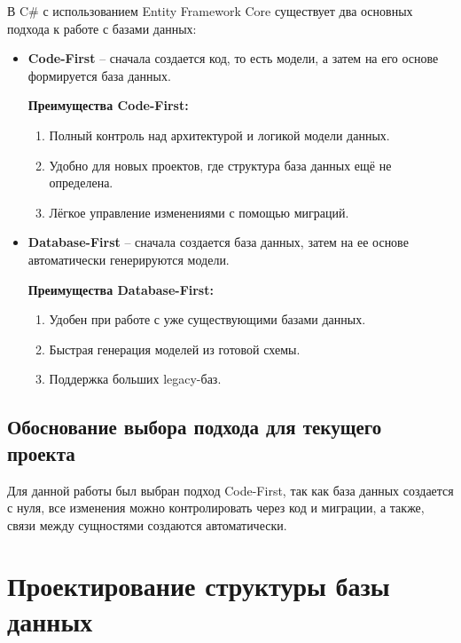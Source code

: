 \documentclass[a4paper,12pt]{report}
\begin{document}
В C\# с использованием Entity Framework Core существует два основных подхода к работе с базами данных:
\begin{itemize}
    \item
        \textbf{Code-First} -- сначала создается код, то есть модели, а затем на его основе формируется база данных.

        \textbf{Преимущества Code-First:}
        \begin{enumerate}
                    \item
                        Полный контроль над архитектурой и логикой модели данных.
                    \item
                        Удобно для новых проектов, где структура база данных ещё не определена.
                    \item
                        Лёгкое управление изменениями с помощью миграций.
        \end{enumerate}
    \item
        \textbf{Database-First} -- сначала создается база данных, затем на ее основе автоматически генерируются модели.

        \textbf{Преимущества Database-First:}
        \begin{enumerate}
                    \item
                        Удобен при работе с уже существующими базами данных.
                    \item
                        Быстрая генерация моделей из готовой схемы.
                    \item
                        Поддержка больших legacy-баз.
        \end{enumerate}
\end{itemize}

\subsection{Обоснование выбора подхода для текущего проекта}

Для данной работы был выбран подход Code-First, так как база данных создается с нуля, все изменения можно контролировать через код и миграции,
а также, связи между сущностями создаются автоматически.

\section{Проектирование структуры базы данных}
\end{document}
